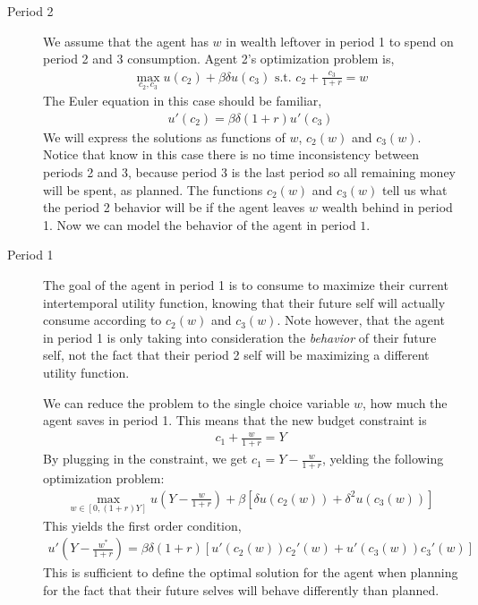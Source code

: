 \begin{description}
    \item[Period 2] We assume that the agent has $w$ in wealth leftover in period 1 to spend on period 2 and 3 consumption. Agent 2's optimization problem is,
    \begin{align*}
        \max_{c_2, c_3} u(c_2) + \beta \delta u(c_3) \text{ s.t. } c_2 + \frac{c_3}{1 + r} = w
    \end{align*} 
    The Euler equation in this case should be familiar,
    \begin{align*}
        u'(c_2) = \beta \delta (1 + r) u'(c_3)
    \end{align*}
    We will express the solutions as functions of $w$, $c_2(w)$ and $c_3(w)$. Notice that know in this case there is no time inconsistency between periods 2 and 3, because period 3 is the last period so all remaining money will be spent, as planned. The functions $c_2(w)$ and $c_3(w)$ tell us what the period 2 behavior will be if the agent leaves $w$ wealth behind in period 1. Now we can model the behavior of the agent in period $1$. 
    \item[Period 1] The goal of the agent in period 1 is to consume to maximize their current intertemporal utility function, knowing that their future self will actually consume according to $c_2(w)$ and $c_3(w)$. Note however, that the agent in period 1 is only taking into consideration the \emph{behavior} of their future self, not the fact that their period 2 self will be maximizing a different utility function. 
    
    We can reduce the problem to the single choice variable $w$, how much the agent saves in period 1. This means that the new budget constraint is
    \begin{align*}
        c_1 + \frac{w}{1 + r} = Y
    \end{align*}
    By plugging in the constraint, we get $c_1 = Y - \frac{w}{1 + r}$, yelding the following optimization problem:
    \begin{align*}
        \max_{w \in [0, (1 + r) Y]} u\left(Y - \frac{w}{1 + r}\right) + \beta[\delta u(c_2(w)) + \delta^2 u(c_3(w))]
    \end{align*}
    This yields the first order condition,
    \begin{align*}
        u'\left(Y - \frac{w^*}{1 + r}\right) = \beta \delta (1 + r) \left[u'(c_2(w))c_2'(w) + u'(c_3(w))c_3'(w)\right] 
    \end{align*}
    This is sufficient to define the optimal solution for the agent when planning for the fact that their future selves will behave differently than planned. 
\end{description}

